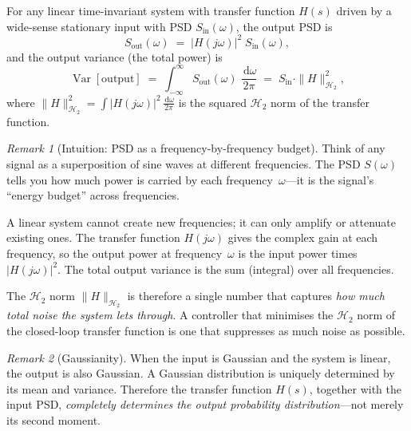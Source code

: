 \documentclass[11pt, a4paper]{article}
\theoremstyle{definition}
\theoremstyle{plain}
\theoremstyle{remark}
\newtheorem{remark}{Remark}[section]
\newcommand{\Var}{\operatorname{Var}}
\newcommand{\dd}{\,\mathrm{d}}                   %
\begin{document}
For any linear time-invariant system with transfer function $H(s)$
driven by a wide-sense stationary input with PSD $S_{\text{in}}(\omega)$,
the output PSD is
\begin{equation}\label{eq:psd-general}
  S_{\text{out}}(\omega) \;=\; \bigl|H(j\omega)\bigr|^2\;
    S_{\text{in}}(\omega),
\end{equation}
and the output variance (the total power) is
\begin{equation}\label{eq:var-psd}
  \Var[\text{output}]
    \;=\; \int_{-\infty}^{\infty}
      S_{\text{out}}(\omega)\;\frac{\dd\omega}{2\pi}
    \;=\; S_{\text{in}} \cdot \|H\|_{\mathcal{H}_2}^2,
\end{equation}
where $\|H\|_{\mathcal{H}_2}^2 = \int |H(j\omega)|^2\,
\frac{\dd\omega}{2\pi}$ is the squared $\mathcal{H}_2$ norm of
the transfer function.

\begin{remark}[Intuition: PSD as a frequency-by-frequency budget]
  Think of any signal as a superposition of sine waves at different
  frequencies.  The PSD $S(\omega)$ tells you how much power is
  carried by each frequency~$\omega$---it is the signal's
  ``energy budget'' across frequencies.

  A linear system cannot create new frequencies; it can only amplify
  or attenuate existing ones.  The transfer function $H(j\omega)$
  gives the complex gain at each frequency, so the output power at
  frequency~$\omega$ is the input power times $|H(j\omega)|^2$.
  The total output variance is the sum (integral) over all
  frequencies.

  The $\mathcal{H}_2$ norm $\|H\|_{\mathcal{H}_2}$ is therefore
  a single number that captures \emph{how much total noise the
  system lets through}.  A controller that minimises the
  $\mathcal{H}_2$ norm of the closed-loop transfer function is
  one that suppresses as much noise as possible.
\end{remark}

\begin{remark}[Gaussianity]
  When the input is Gaussian and the system is linear, the output
  is also Gaussian.  A Gaussian distribution is uniquely determined
  by its mean and variance.  Therefore the transfer function
  $H(s)$, together with the input PSD, \emph{completely determines
  the output probability distribution}---not merely its second
  moment.
\end{remark}

\end{document}

